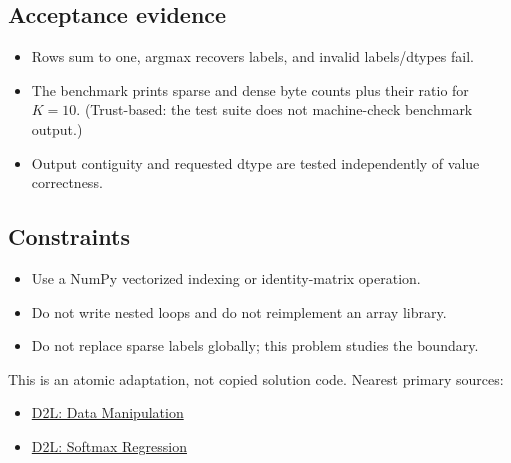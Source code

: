         \subsection{Acceptance evidence}

        \begin{evidencebox}
        \begin{itemize}
          \item Rows sum to one, argmax recovers labels, and invalid labels/dtypes fail.
  \item The benchmark prints sparse and dense byte counts plus their ratio for $K=10$. (Trust-based: the test suite does not machine-check benchmark output.)
  \item Output contiguity and requested dtype are tested independently of value correctness.
        \end{itemize}
        \end{evidencebox}

        \subsection{Constraints}

        \begin{itemize}
          \item Use a NumPy vectorized indexing or identity-matrix operation.
  \item Do not write nested loops and do not reimplement an array library.
  \item Do not replace sparse labels globally; this problem studies the boundary.
        \end{itemize}

        \begin{sourcebox}
        This is an atomic adaptation, not copied solution code. Nearest primary sources:
        \begin{itemize}
          \item \href{https://d2l.ai/chapter_preliminaries/ndarray.html}{D2L: Data Manipulation}
  \item \href{https://d2l.ai/chapter_linear-classification/softmax-regression.html}{D2L: Softmax Regression}
        \end{itemize}
        \end{sourcebox}
